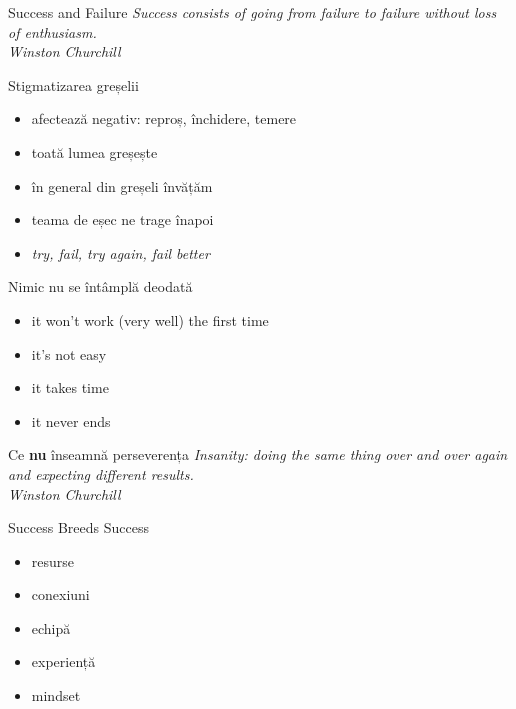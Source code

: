 \documentclass{simple}
\begin{document}
\begin{frame}{Success and Failure}
  \centering
  \textit{Success consists of going from failure to failure without loss of enthusiasm.} \\
  \vspace{3mm}
  \hfill \textit{Winston Churchill}
\end{frame}

\begin{frame}{Stigmatizarea greșelii}
  \begin{itemize}
    \pause \item afectează negativ: reproș, închidere, temere
    \pause \item toată lumea greșește
    \pause \item în general din greșeli învățăm
    \pause \item teama de eșec ne trage înapoi
    \pause \item \textit{try, fail, try again, fail better}
  \end{itemize}
\end{frame}

\begin{frame}{Nimic nu se întâmplă deodată}
  \begin{itemize}
    \pause \item it won't work (very well) the first time
    \pause \item it's not easy
    \pause \item it takes time
    \pause \item it never ends
  \end{itemize}
\end{frame}

\begin{frame}{Ce \textbf{nu} înseamnă perseverența}
  \pause
  \centering
  \textit{Insanity: doing the same thing over and over again and expecting different results.} \\
  \vspace{3mm}
  \hfill \textit{Winston Churchill}
\end{frame}

\begin{frame}{Success Breeds Success}
  \begin{itemize}
    \pause \item resurse
    \pause \item conexiuni
    \pause \item echipă
    \pause \item experiență
    \pause \item mindset
  \end{itemize}
\end{frame}
\end{document}
